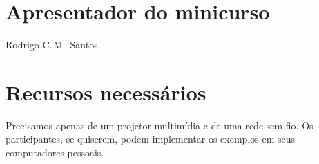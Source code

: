\documentclass{SBCbookchapter}
\begin{document}

\section{Apresentador do minicurso}

Rodrigo C.\,M.~Santos.


\section{Recursos necessários}

Precisamos apenas de um projetor multimídia e de uma rede sem fio.  Os
participantes, se quiserem, podem implementar os exemplos em seus
computadores pessoais.




\end{document}
